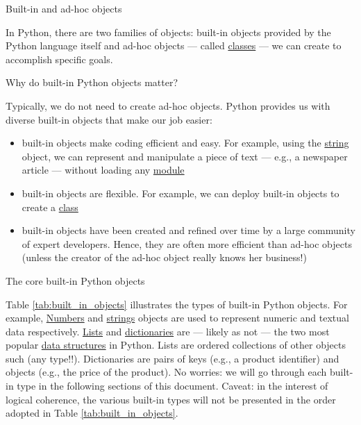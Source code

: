 \documentclass[a4paper,11pt]{book}
\numberwithin{figure}{chapter}
\numberwithin{table}{chapter}
\newcommand{\question}[1]{%
    \begin{tcolorbox}[colback=comp_c!10,colframe=comp_c,sidebyside align=top,width=\linewidth,before skip=1ex]
        #1
    \end{tcolorbox}
    \switchcolumn%
}
\newcommand{\note}[1]{%
    \begin{tcolorbox}[colback=white!0,colframe=white!10,width=\linewidth,before skip=1ex]
        #1
    \end{tcolorbox}
}
\begin{document}
\begin{paracol}{2}
    \question{\raggedright Built-in and ad-hoc objects}
    \note{In Python, there are two families of objects: built-in objects provided by the Python language itself and ad-hoc objects --- called \href{https://docs.python.org/3/tutorial/classes.html}{classes} --- we can create to accomplish specific goals.}
\end{paracol}

\begin{paracol}{2}
    \question{\raggedright Why do built-in Python objects matter?} 
    \note{
    Typically, we do not need to create ad-hoc objects. Python provides us with diverse built-in objects that make our job easier:
    \begin{itemize}
    	\item built-in objects make coding efficient and easy. For example, using the \href{https://docs.python.org/3/tutorial/introduction.html\#strings}{string} object, we can represent and manipulate a piece of text --- e.g., a newspaper article --- without loading any \href{https://docs.python.org/3/tutorial/modules.html}{module}
    	\item built-in objects are flexible. For example, we can deploy built-in objects to create a \href{https://docs.python.org/3/tutorial/classes.html}{class}
    	\item built-in objects have been created and refined over time by a large community of expert developers. Hence, they are  often  more  efficient  than  ad-hoc objects (unless the creator of the ad-hoc object really knows her business!)
    \end{itemize}
    }
\end{paracol}
\clearpage

\begin{paracol}{2}
    \question{\raggedright The core built-in Python objects} 
	\note{Table \ref{tab:built_in_objects} illustrates the types of built-in Python objects. For example, \href{https://docs.python.org/3/tutorial/introduction.html\#numbers}{Numbers} and \href{https://docs.python.org/3/tutorial/introduction.html\#strings}{strings} objects are used to represent numeric and textual data respectively. \href{https://docs.python.org/3/tutorial/introduction.html\#lists}{Lists} and \href{https://docs.python.org/3/tutorial/datastructures.html\#dictionaries}{dictionaries} are --- likely as not --- the two most popular \href{https://docs.python.org/3/tutorial/datastructures.html}{data structures} in Python. Lists are ordered collections of other objects such (any type!!). Dictionaries are pairs of keys (e.g., a product identifier) and objects (e.g., the price of the product). No worries: we will go through each built-in type in the following sections of this document. Caveat: in the interest of logical coherence, the various built-in types will not be presented in the order adopted in Table \ref{tab:built_in_objects}.} 
\end{paracol}
\end{document}
